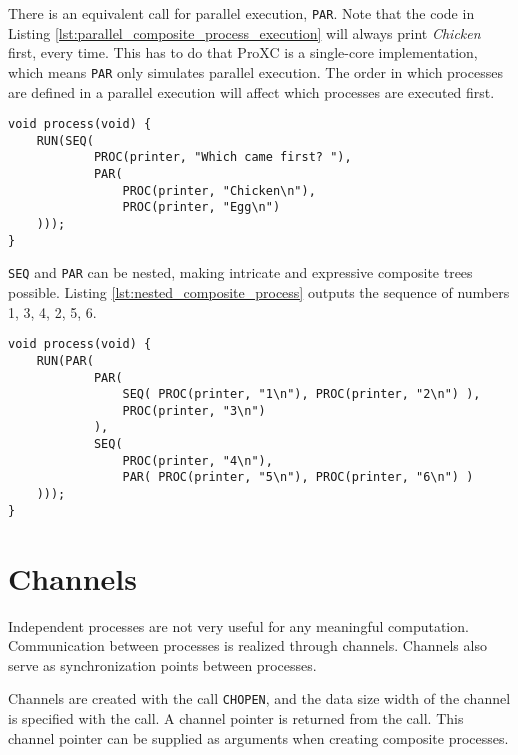 There is an equivalent call for parallel execution, \texttt{PAR}. Note that the code in Listing \ref{lst:parallel_composite_process_execution} will always print \textit{Chicken} first, every time. This has to do that ProXC is a single\hyp{}core implementation, which means \texttt{PAR} only simulates parallel execution. The order in which processes are defined in a parallel execution will affect which processes are executed first. 

\noindent\begin{minipage}{\textwidth}
\begin{lstlisting}[style={CustomC},caption={Parallel composite process execution},label={lst:parallel_composite_process_execution}]
void process(void) {
    RUN(SEQ(
            PROC(printer, "Which came first? "),
            PAR(
                PROC(printer, "Chicken\n"),
                PROC(printer, "Egg\n")
    )));  
}
\end{lstlisting}
\end{minipage}

\texttt{SEQ} and \texttt{PAR} can be nested, making intricate and expressive composite trees possible. Listing \ref{lst:nested_composite_process} outputs the sequence of numbers 1, 3, 4, 2, 5, 6.  

\noindent\begin{minipage}{\textwidth}
\begin{lstlisting}[style={CustomC},caption={Nested composite process},label={lst:nested_composite_process}]
void process(void) {
    RUN(PAR(
            PAR(
                SEQ( PROC(printer, "1\n"), PROC(printer, "2\n") ),
                PROC(printer, "3\n")
            ),
            SEQ(
                PROC(printer, "4\n"),
                PAR( PROC(printer, "5\n"), PROC(printer, "6\n") )
    )));  
}
\end{lstlisting}
\end{minipage}

\section*{Channels}

Independent processes are not very useful for any meaningful computation. Communication between processes is realized through channels. Channels also serve as synchronization points between processes. 

Channels are created with the call \texttt{CHOPEN}, and the data size width of the channel is specified with the call. A channel pointer is returned from the call. This channel pointer can be supplied as arguments when creating composite processes. 

